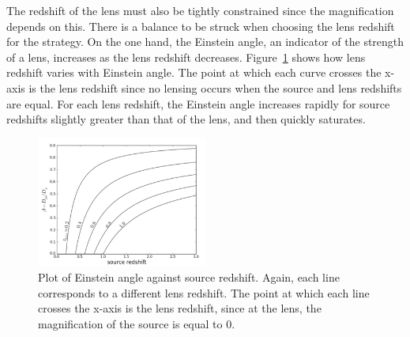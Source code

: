 		The redshift of the lens must also be tightly constrained since the magnification depends on this. There is a balance to be struck when choosing the lens redshift for the strategy. On the one hand, the Einstein angle, an indicator of the strength of a lens, increases as the lens redshift decreases. Figure~\ref{fig:Einstein_angle_as_a_function_of_source_redshift} shows how lens redshift varies with Einstein angle. The point at which each curve crosses the x-axis is the lens redshift since no lensing occurs when the source and lens redshifts are equal. For each lens redshift, the Einstein angle increases rapidly for source redshifts slightly greater than that of the lens, and then quickly saturates. \cite{Constraining_source_redshift_distributions}
		\begin{figure}[!htbp]
			\centering
				\includegraphics[width=0.5\textwidth]{../Images/Einstein_angle_as_a_function_of_source_redshift.png}
			\caption[Einstein angle as a function of source redshift]{\cite{Constraining_source_redshift_distributions} Plot of Einstein angle against source redshift. Again, each line corresponds to a different lens redshift. The point at which each line crosses the x-axis is the lens redshift, since at the lens, the magnification of the source is equal to 0.\label{fig:Einstein_angle_as_a_function_of_source_redshift}}
		\end{figure}

